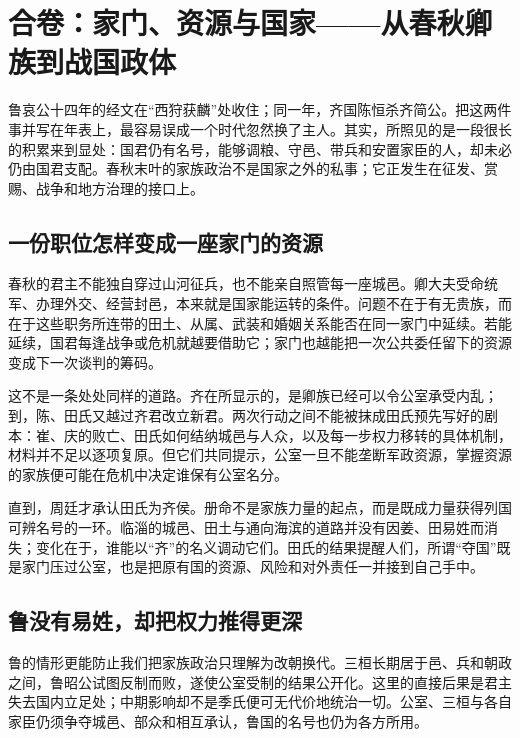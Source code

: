 \section{合卷：家门、资源与国家——从春秋卿族到战国政体}

鲁哀公十四年的经文在“西狩获麟”处收住；同一年，齐国陈恒杀齐简公。把这两件事并写在年表上，最容易误成一个时代忽然换了主人。其实，所照见的是一段很长的积累来到显处：国君仍有名号，能够调粮、守邑、带兵和安置家臣的人，却未必仍由国君支配。春秋末叶的家族政治不是国家之外的私事；它正发生在征发、赏赐、战争和地方治理的接口上。

\subsection{一份职位怎样变成一座家门的资源}

春秋的君主不能独自穿过山河征兵，也不能亲自照管每一座城邑。卿大夫受命统军、办理外交、经营封邑，本来就是国家能运转的条件。问题不在于有无贵族，而在于这些职务所连带的田土、从属、武装和婚姻关系能否在同一家门中延续。若能延续，国君每逢战争或危机就越要借助它；家门也越能把一次公共委任留下的资源变成下一次谈判的筹码。

这不是一条处处同样的道路。齐在所显示的，是卿族已经可以令公室承受内乱；到，陈、田氏又越过齐君改立新君。两次行动之间不能被抹成田氏预先写好的剧本：崔、庆的败亡、田氏如何结纳城邑与人众，以及每一步权力移转的具体机制，材料并不足以逐项复原。但它们共同提示，公室一旦不能垄断军政资源，掌握资源的家族便可能在危机中决定谁保有公室名分。

直到，周廷才承认田氏为齐侯。册命不是家族力量的起点，而是既成力量获得列国可辨名号的一环。临淄的城邑、田土与通向海滨的道路并没有因姜、田易姓而消失；变化在于，谁能以“齐”的名义调动它们。田氏的结果提醒人们，所谓“夺国”既是家门压过公室，也是把原有国的资源、风险和对外责任一并接到自己手中。

\subsection{鲁没有易姓，却把权力推得更深}

鲁的情形更能防止我们把家族政治只理解为改朝换代。三桓长期居于邑、兵和朝政之间，鲁昭公试图反制而败，遂使公室受制的结果公开化。这里的直接后果是君主失去国内立足处；中期影响却不是季氏便可无代价地统治一切。公室、三桓与各自家臣仍须争夺城邑、部众和相互承认，鲁国的名号也仍为各方所用。

